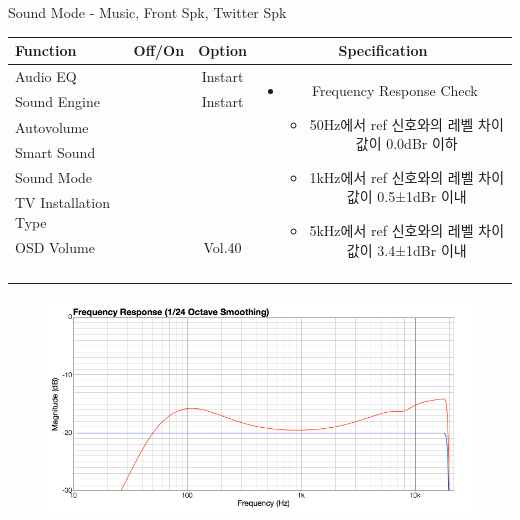 \begin{frame}[t]{Sound Mode - Music, Front Spk, Twitter Spk}
\begin{tiny}
\begin{tabular}{@{}lccc@{}}
\toprule
Function & Off/On & Option & Specification \\
\midrule
Audio EQ & \color{black}{Off} & Instart &
\multirow{10}{60mm}{
\begin{itemize}
	\item Frequency Response Check
	\begin{itemize}
		\item 50Hz에서 ref 신호와의 레벨 차이값이 0.0dBr 이하		
		\item 1kHz에서 ref 신호와의 레벨 차이값이 0.5±1dBr 이내
		\item 5kHz에서 ref 신호와의 레벨 차이값이 3.4±1dBr 이내		
	\end{itemize}
\end{itemize}
} \\
Sound Engine & \color{blue}{On} & Instart & \\
Autovolume & \color{black}{Off} & & \\
Smart Sound & \color{black}{Off} & & \\
Sound Mode & \color{blue}{On} & \color{blue}{Music} & \\
TV Installation Type & \color{blue}{On} & \color{black}{Standtype1} & \\
OSD Volume & \color{blue}{On} & Vol.40 & \\
& & & \\
& & & \\
& & & \\
& & & \\
\midrule
\end{tabular}
\end{tiny}

\begin{figure}[b]
\includegraphics[height=0.4\textwidth]{figures/music.png}
\end{figure}

\end{frame}

